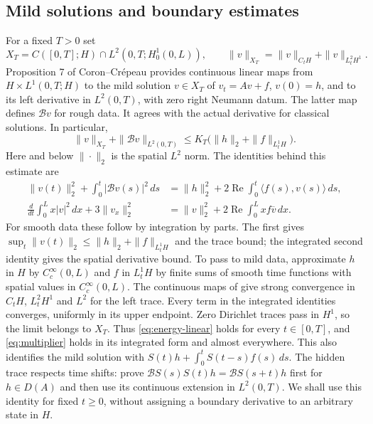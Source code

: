 \documentclass[11pt]{article}
\theoremstyle{remark}\newtheorem{remark}[theorem]{Remark}
\numberwithin{equation}{section}
\begin{document}
\subsection{Mild solutions and boundary estimates}
For a fixed $T>0$ set
\[
 X_T=C([0,T];H)\cap L^2(0,T;H^1_0(0,L)),\qquad
 \|v\|_{X_T}=\|v\|_{C_tH}+\|v\|_{L^2_tH^1}.
\]
Proposition 7 of Coron--Cr\'epeau \cite{CC} provides continuous linear maps
from $H\times L^1(0,T;H)$ to the mild solution $v\in X_T$ of
$v_t=Av+f$, $v(0)=h$, and to its left derivative in $L^2(0,T)$, with zero
right Neumann datum. The latter map defines $\mathcal Bv$ for rough data.
It agrees with the actual derivative for classical solutions. In particular,
\begin{equation}\label{eq:forced-estimate}
 \|v\|_{X_T}+\|\mathcal Bv\|_{L^2(0,T)}
 \le K_T\bigl(\|h\|_2+\|f\|_{L^1_tH}\bigr).
\end{equation}
Here and below $\|\cdot\|_2$ is the spatial $L^2$ norm.
The identities behind this estimate are
\begin{align}
 \|v(t)\|_2^2+\int_0^t|\mathcal Bv(s)|^2\,ds
 &=\|h\|_2^2+2\operatorname{Re}\int_0^t\langle f(s),v(s)\rangle\,ds,
 \label{eq:energy-linear}\\
 \frac{d}{dt}\int_0^L x|v|^2\,dx+3\|v_x\|_2^2
 &=\|v\|_2^2+2\operatorname{Re}\int_0^L xf\overline v\,dx.
 \label{eq:multiplier}
\end{align}
For smooth data these follow by integration by parts. The first gives
$\sup_t\|v(t)\|_2\le\|h\|_2+\|f\|_{L^1_tH}$ and the trace bound;
the integrated second identity gives the spatial derivative bound.
To pass to mild data, approximate $h$ in $H$ by $C^\infty_c(0,L)$ and
$f$ in $L^1_tH$ by finite sums of smooth time functions with spatial values
in $C^\infty_c(0,L)$. The continuous maps of \cite[Proposition 7]{CC} give
strong convergence in $C_tH$, $L^2_tH^1$ and $L^2$ for the left trace.
Every term in the integrated identities converges, uniformly in its upper
endpoint. Zero Dirichlet traces pass in $H^1$, so the limit belongs to $X_T$.
Thus \eqref{eq:energy-linear} holds for every $t\in[0,T]$, and
\eqref{eq:multiplier} holds in its integrated form and almost everywhere.
This also identifies the mild solution with
$S(t)h+\int_0^t S(t-s)f(s)\,ds$.
The hidden trace respects time shifts: prove
$\mathcal BS(s)S(t)h=\mathcal BS(s+t)h$ first for $h\in D(A)$ and then use
its continuous extension in $L^2(0,T)$. We shall use this identity for fixed
$t\ge0$, without assigning a boundary derivative to an arbitrary state in $H$.
\end{document}
